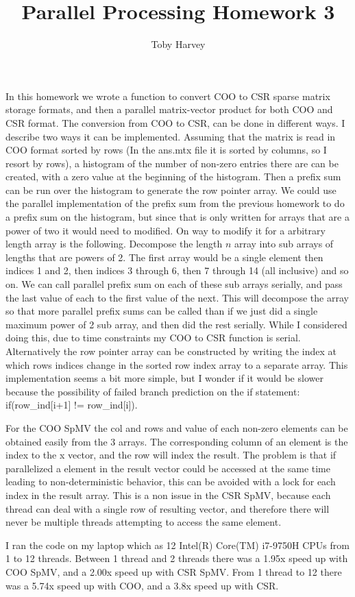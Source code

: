 \documentclass{article}
\begin{document}
\title{Parallel Processing Homework 3}
\author{Toby Harvey}
\maketitle

\noindent In this homework we wrote a function to convert COO to CSR sparse matrix storage formats, and then a parallel matrix-vector product for both COO and CSR format. The conversion from COO to CSR, can be done in different ways. I describe two ways it can be implemented. Assuming that the matrix is read in COO format sorted by rows (In the ans.mtx file it is sorted by columns, so I resort by rows), a histogram of the number of non-zero entries there are can be created, with a zero value at the beginning of the histogram. Then a prefix sum can be run over the histogram to generate the row pointer array. We could use the parallel implementation of the prefix sum from the previous homework to do a prefix sum on the histogram, but since that is only written for arrays that are a power of two it would need to modified. On way to modify it for a arbitrary length array is the following. Decompose the length $n$ array into sub arrays of lengths that are powers of 2. The first array would be a single element then indices 1 and 2, then indices 3 through 6, then 7 through 14 (all inclusive) and so on. We can call parallel prefix sum on each of these sub arrays serially, and pass the last value of each to the first value of the next. This will decompose the array so that more parallel prefix sums can be called than if we just did a single maximum power of 2 sub array, and then did the rest serially. While I considered doing this, due to time constraints my COO to CSR function is serial. Alternatively the row pointer array can be constructed by writing the index at which rows indices change in the sorted row index array to a separate array. This implementation seems a bit more simple, but I wonder if it would be slower because the possibility of failed branch prediction on the if statement: if(row\_ind[i+1] != row\_ind[i]).

\noindent For the COO SpMV the col and rows and value of each non-zero elements can be obtained easily from the 3 arrays. The corresponding column of an element is the index to the x vector, and the row will index the result. The problem is that if parallelized a element in the result vector could be accessed at the same time leading to non-deterministic behavior, this can be avoided with a lock for each index in the result array. This is a non issue in the CSR SpMV, because each thread can deal with a single row of resulting vector, and therefore there will never be multiple threads attempting to access the same element.




\noindent I ran the code on my laptop which as 12 Intel(R) Core(TM) i7-9750H CPUs from 1 to 12 threads. Between 1 thread and 2 threads there was a 1.95x speed up with COO SpMV, and a 2.00x speed up with CSR SpMV. From 1 thread to 12 there was a 5.74x speed up with COO, and a 3.8x speed up with CSR.
\end{document}
